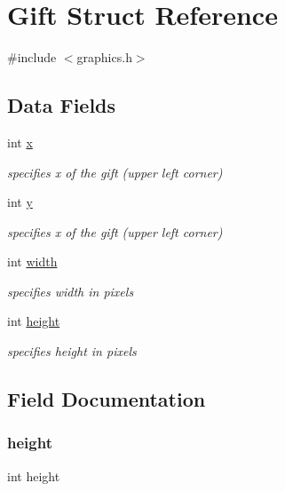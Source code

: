 \hypertarget{struct_gift}{}\section{Gift Struct Reference}
\label{struct_gift}


{\ttfamily \#include $<$graphics.\+h$>$}

\subsection*{Data Fields}
\begin{DoxyCompactItemize}
\item 
int \hyperlink{struct_gift_a6150e0515f7202e2fb518f7206ed97dc}{x}
\begin{DoxyCompactList}\small\item\em specifies x of the gift (upper left corner) \end{DoxyCompactList}\item 
int \hyperlink{struct_gift_a0a2f84ed7838f07779ae24c5a9086d33}{y}
\begin{DoxyCompactList}\small\item\em specifies x of the gift (upper left corner) \end{DoxyCompactList}\item 
int \hyperlink{struct_gift_a2474a5474cbff19523a51eb1de01cda4}{width}
\begin{DoxyCompactList}\small\item\em specifies width in pixels \end{DoxyCompactList}\item 
int \hyperlink{struct_gift_ad12fc34ce789bce6c8a05d8a17138534}{height}
\begin{DoxyCompactList}\small\item\em specifies height in pixels \end{DoxyCompactList}\end{DoxyCompactItemize}


\subsection{Field Documentation}
\mbox{\label{struct_gift_ad12fc34ce789bce6c8a05d8a17138534}} 
\subsubsection{\texorpdfstring{height}{height}}
{\footnotesize\ttfamily int height}



